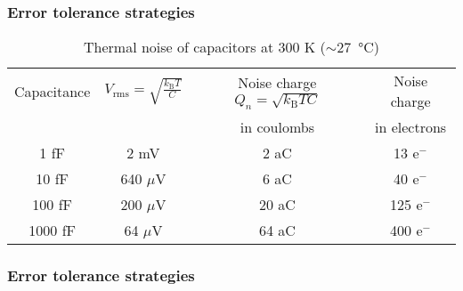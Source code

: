 \documentclass[aspectratio=169]{beamer}
\begin{document}
\begin{frame}
\frametitle{Error tolerance strategies}

\begin{table}[h!]
\centering
\caption{Thermal noise of capacitors at 300 K ($\sim$\SI{27}{\degreeCelsius})}
\label{tab:thermal_noise}
\begin{tabular}{cccc}
\toprule
Capacitance & $V_\text{rms} = \sqrt{\frac{k_{\text{B}}T}{C}}$ & Noise charge $Q_{n} = \sqrt{k_{\text{B}}TC}$ & Noise charge \\
    & & in coulombs & in electrons \\
\midrule
1 fF & 2 mV & 2 aC & 13 e$^{-}$ \\
10 fF & 640 $\mu$V & 6 aC & 40 e$^{-}$ \\
100 fF & 200 $\mu$V & 20 aC & 125 e$^{-}$ \\
1000 fF & 64 $\mu$V & 64 aC & 400 e$^{-}$ \\
\bottomrule
\end{tabular}
\end{table}

\end{frame}

\begin{frame}
\frametitle{Error tolerance strategies}


\end{frame}
\end{document}
